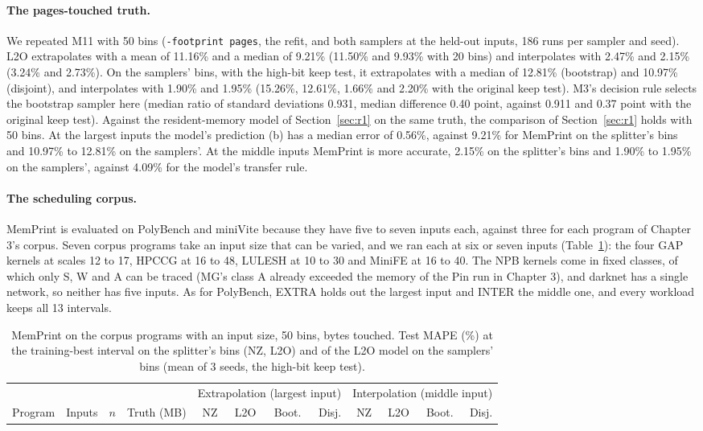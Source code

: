 \documentclass[11pt]{article}
\newcommand{\tabinput}[1]{}
\newcommand{\memprint}{MemPrint}
\begin{document}
\paragraph{The pages-touched truth.} We repeated M11 with 50 bins (\texttt{-footprint pages}, the refit, and both
samplers at the held-out inputs, 186 runs per sampler and seed). L2O extrapolates with a mean of 11.16\% and a
median of 9.21\% (11.50\% and 9.93\% with 20 bins) and interpolates with 2.47\% and 2.15\% (3.24\% and 2.73\%). On
the samplers' bins, with the high-bit keep test, it extrapolates with a median of 12.81\% (bootstrap) and 10.97\%
(disjoint), and interpolates with 1.90\% and 1.95\% (15.26\%, 12.61\%, 1.66\% and 2.20\% with the original keep
test). M3's decision rule selects the bootstrap sampler here (median ratio of standard deviations 0.931, median
difference 0.40 point, against 0.911 and 0.37 point with the original keep test). Against the resident-memory model
of Section~\ref{sec:r1} on the same truth, the comparison of Section~\ref{sec:r1} holds with 50 bins. At the largest
inputs the model's prediction (b) has a median error of 0.56\%, against 9.21\% for \memprint{} on the splitter's
bins and 10.97\% to 12.81\% on the samplers'. At the middle inputs \memprint{} is more accurate, 2.15\% on the
splitter's bins and 1.90\% to 1.95\% on the samplers', against 4.09\% for the model's transfer rule.

\paragraph{The scheduling corpus.} \memprint{} is evaluated on PolyBench and miniVite because they have five to seven
inputs each, against three for each program of Chapter 3's corpus. Seven corpus programs take an input size that
can be varied, and we ran each at six or seven inputs (Table~\ref{tab:b50corpus}): the four GAP kernels at scales 12
to 17, HPCCG at 16 to 48, LULESH at 10 to 30 and MiniFE at 16 to 40. The NPB kernels come in fixed classes, of which
only S, W and A can be traced (MG's class A already exceeded the memory of the Pin run in Chapter 3), and darknet
has a single network, so neither has five inputs. As for PolyBench, EXTRA holds out the largest input and INTER the
middle one, and every workload keeps all 13 intervals.

\begin{table}[htbp]
\centering
\caption{\memprint{} on the corpus programs with an input size, 50 bins, bytes touched. Test MAPE (\%) at the
training-best interval on the splitter's bins (NZ, L2O) and of the L2O model on the samplers' bins (mean of 3 seeds, the high-bit keep test).}
\label{tab:b50corpus}
\footnotesize
\setlength{\tabcolsep}{3.5pt}
\begin{tabular}{@{}lrrrrrrrrrrr@{}}
\toprule
& & & & \multicolumn{4}{c}{Extrapolation (largest input)} & \multicolumn{4}{c}{Interpolation (middle input)} \\
\cmidrule(lr){5-8}\cmidrule(l){9-12}
Program & Inputs & $n$ & Truth (MB) & NZ & L2O & Boot. & Disj. & NZ & L2O & Boot. & Disj. \\
\midrule
\tabinput{b50_corpus}
\bottomrule
\end{tabular}
\end{table}
\end{document}
